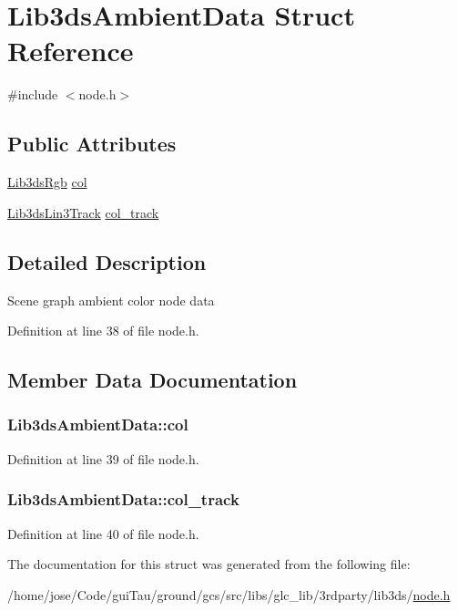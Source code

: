 \hypertarget{struct_lib3ds_ambient_data}{\section{Lib3ds\-Ambient\-Data Struct Reference}
\label{struct_lib3ds_ambient_data}
}


{\ttfamily \#include $<$node.\-h$>$}

\subsection*{Public Attributes}
\begin{DoxyCompactItemize}
\item 
\hyperlink{types_8h_a7e320d64d2488320001f7f3b25168ee3}{Lib3ds\-Rgb} \hyperlink{struct_lib3ds_ambient_data_ad9ec1a96ead48d2595d9cbc398948443}{col}
\item 
\hyperlink{struct_lib3ds_lin3_track}{Lib3ds\-Lin3\-Track} \hyperlink{struct_lib3ds_ambient_data_ac48689ce36f9ada37d14ba55d0ec0ccd}{col\-\_\-track}
\end{DoxyCompactItemize}


\subsection{Detailed Description}
Scene graph ambient color node data 

Definition at line 38 of file node.\-h.



\subsection{Member Data Documentation}
\hypertarget{struct_lib3ds_ambient_data_ad9ec1a96ead48d2595d9cbc398948443}{
\subsubsection[{col}]{ Lib3ds\-Ambient\-Data\-::col}}\label{struct_lib3ds_ambient_data_ad9ec1a96ead48d2595d9cbc398948443}


Definition at line 39 of file node.\-h.

\hypertarget{struct_lib3ds_ambient_data_ac48689ce36f9ada37d14ba55d0ec0ccd}{
\subsubsection[{col\-\_\-track}]{ Lib3ds\-Ambient\-Data\-::col\-\_\-track}}\label{struct_lib3ds_ambient_data_ac48689ce36f9ada37d14ba55d0ec0ccd}


Definition at line 40 of file node.\-h.



The documentation for this struct was generated from the following file\-:\begin{DoxyCompactItemize}
\item 
/home/jose/\-Code/gui\-Tau/ground/gcs/src/libs/glc\-\_\-lib/3rdparty/lib3ds/\hyperlink{node_8h}{node.\-h}\end{DoxyCompactItemize}
